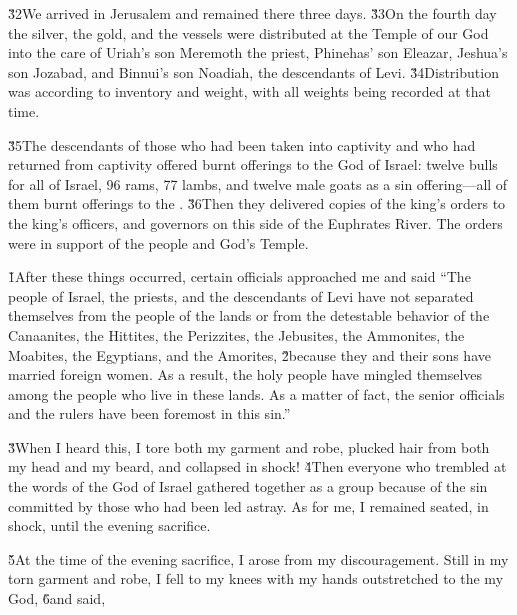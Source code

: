 \v{32}We arrived in Jerusalem and remained there three days. \v{33}On the fourth day the silver, the gold, and the vessels were distributed at the Temple of our God into the care of Uriah's son Meremoth the priest, Phinehas' son Eleazar, Jeshua's son Jozabad, and Binnui's son Noadiah, the descendants of Levi. \v{34}Distribution was according to inventory and weight, with all weights being recorded at that time.

\v{35}The descendants of those who had been taken into captivity and who had returned from captivity offered burnt offerings to the God of Israel: twelve bulls for all of Israel, 96 rams, 77 lambs, and twelve male goats as a sin offering---all of them burnt offerings to the . \v{36}Then they delivered copies of the king's orders to the king's officers, and governors on this side of the Euphrates River. The orders were in support of the people and God's Temple.

\v{1}After these things occurred, certain officials approached me and said ``The people of Israel, the priests, and the descendants of Levi have not separated themselves from the people of the lands or from the detestable behavior of the Canaanites, the Hittites, the Perizzites, the Jebusites, the Ammonites, the Moabites, the Egyptians, and the Amorites, \v{2}because they and their sons have married foreign women. As a result, the holy people have mingled themselves among the people who live in these lands. As a matter of fact, the senior officials and the rulers have been foremost in this sin.''

\v{3}When I heard this, I tore both my garment and robe, plucked hair from both my head and my beard, and collapsed in shock! \v{4}Then everyone who trembled at the words of the God of Israel gathered together as a group because of the sin committed by those who had been led astray. As for me, I remained seated, in shock, until the evening sacrifice.

\v{5}At the time of the evening sacrifice, I arose from my discouragement. Still in my torn garment and robe, I fell to my knees with my hands outstretched to the  my God, \v{6}and said,

